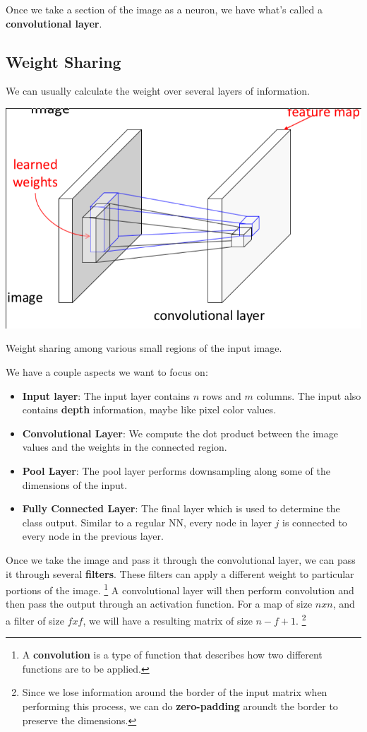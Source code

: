 \documentclass{tufte-handout}
\begin{document}
Once we take a section of the image as a neuron, we have what's called a \textbf{convolutional layer}.
\subsection{Weight Sharing}
We can usually calculate the weight over several layers of information. 

\begin{marginfigure}
		\includegraphics[scale=0.2]{weight_sharing}
	\caption{Weight sharing among various small regions of the input image.}
\end{marginfigure}

We have a couple aspects we want to focus on:
\begin{itemize}
	\item \textbf{Input layer}: The input layer contains $n$ rows and $m$ columns. The input also contains 
			\textbf{depth} information, maybe like pixel color values.
	\item \textbf{Convolutional Layer}: We compute the dot product between the image values and the weights 
			in the connected region. 
	\item \textbf{Pool Layer}: The pool layer performs downsampling along some of the dimensions of the 
			input.
	\item \textbf{Fully Connected Layer}: The final layer which is used to determine the class output. 
			Similar to a regular NN, every node in layer $j$ is connected to every node in the previous
					layer.
\end{itemize}
Once we take the image and pass it through the convolutional layer, we can pass it through several 
	\textbf{filters}. 
These filters can apply a different weight to particular portions of the image. 
\footnote{A \textbf{convolution} is a type of function that describes how two different functions are to 
be applied.}
A convolutional layer will then perform convolution and then pass the output through an activation function.
For a map of size $nxn$, and a filter of size $fxf$, we will have a resulting matrix of size $n-f+1$.
\footnote{Since we lose information around the border of the input matrix when performing this process,
	we can do \textbf{zero-padding} aroundt the border to preserve the dimensions.}
\end{document}
